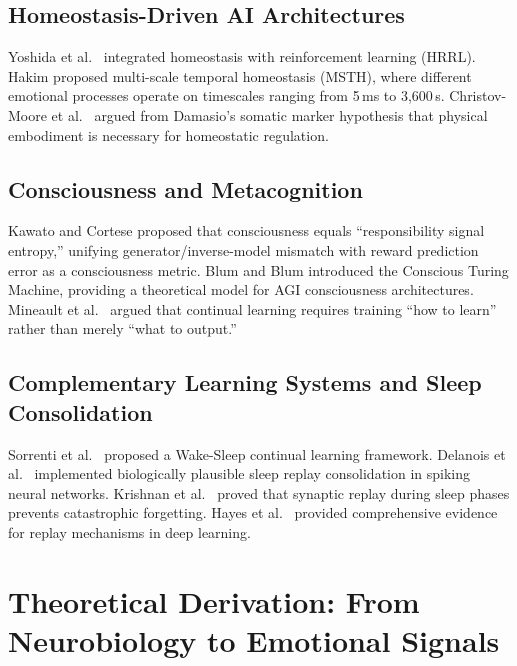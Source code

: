 \documentclass[pdflatex,sn-mathphys-num]{sn-jnl}
\theoremstyle{thmstyleone}%
\theoremstyle{thmstyletwo}%
\theoremstyle{thmstylethree}%
\begin{document}
\subsection{Homeostasis-Driven AI Architectures}

Yoshida et al.\ \cite{yoshida2025hrrl} integrated homeostasis with reinforcement learning (HRRL). Hakim \cite{hakim2026msth} proposed multi-scale temporal homeostasis (MSTH), where different emotional processes operate on timescales ranging from 5\,ms to 3,600\,s. Christov-Moore et al.\ \cite{christov2025embodiment} argued from Damasio's somatic marker hypothesis \cite{damasio1999feeling} that physical embodiment is necessary for homeostatic regulation.

\subsection{Consciousness and Metacognition}

Kawato and Cortese \cite{kawato2023metacognitive} proposed that consciousness equals ``responsibility signal entropy,'' unifying generator/inverse-model mismatch with reward prediction error as a consciousness metric. Blum and Blum \cite{blum2023ctm} introduced the Conscious Turing Machine, providing a theoretical model for AGI consciousness architectures. Mineault et al.\ \cite{mineault2026dark} argued that continual learning requires training ``how to learn'' rather than merely ``what to output.''

\subsection{Complementary Learning Systems and Sleep Consolidation}

Sorrenti et al.\ \cite{sorrenti2024wake} proposed a Wake-Sleep continual learning framework. Delanois et al.\ \cite{delanois2026sleep} implemented biologically plausible sleep replay consolidation in spiking neural networks. Krishnan et al.\ \cite{krishnan2019sleep} proved that synaptic replay during sleep phases prevents catastrophic forgetting. Hayes et al.\ \cite{hayes2021replay} provided comprehensive evidence for replay mechanisms in deep learning.

\section{Theoretical Derivation: From Neurobiology to Emotional Signals}\label{sec:derivation}
\end{document}
